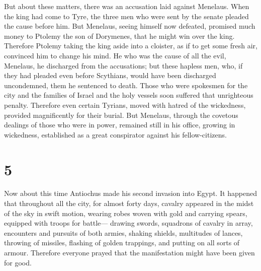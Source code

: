  But about these matters, there was an accusation laid
against Menelaus.  When the king had come to Tyre, the
three men who were sent by the senate pleaded the cause before him.
 But Menelaus, seeing himself now defeated, promised much
money to Ptolemy the son of Dorymenes, that he might win over the king.
 Therefore Ptolemy taking the king aside into a cloister,
as if to get some fresh air, convinced him to change his mind.
 He who was the cause of all the evil, Menelaus, he
discharged from the accusations; but these hapless men, who, if they had
pleaded even before Scythians, would have been discharged uncondemned,
them he sentenced to death.  Those who were spokesmen for
the city and the families of Israel and the holy vessels soon suffered
that unrighteous penalty.  Therefore even certain Tyrians,
moved with hatred of the wickedness, provided magnificently for their
burial.  But Menelaus, through the covetous dealings of
those who were in power, remained still in his office, growing in
wickedness, established as a great conspirator against his
fellow-citizens.

\hypertarget{section-4}{%
\section{5}\label{section-4}}

 Now about this time Antiochus made his second invasion into
Egypt.  It happened that throughout all the city, for almost
forty days, cavalry appeared in the midst of the sky in swift motion,
wearing robes woven with gold and carrying spears, equipped with troops
for battle---  drawing swords, squadrons of cavalry in
array, encounters and pursuits of both armies, shaking shields,
multitudes of lances, throwing of missiles, flashing of golden
trappings, and putting on all sorts of armour.  Therefore
everyone prayed that the manifestation might have been given for good.

